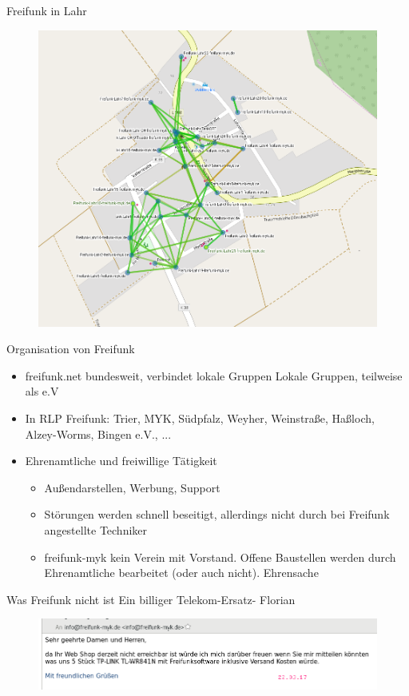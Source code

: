 \documentclass{beamer}
\begin{document}
\begin{frame}{Freifunk in Lahr}

\begin{figure}
	\centering
	\includegraphics[width=0.7\linewidth]{Bilder/Lahr}
	\caption{}
	\label{fig:lahr}
\end{figure}

\end{frame}

\begin{frame} {Organisation von Freifunk}
\begin{itemize}
\item freifunk.net bundesweit, verbindet lokale Gruppen
Lokale Gruppen, teilweise als e.V
\item In RLP Freifunk: Trier, MYK, Südpfalz, Weyher, Weinstraße, Haßloch, Alzey-Worms, Bingen e.V., ...
\item Ehrenamtliche und freiwillige Tätigkeit
\begin{itemize}
\item Außendarstellen, Werbung, Support
\item Störungen werden schnell beseitigt, allerdings nicht durch bei Freifunk angestellte Techniker
\item freifunk-myk kein Verein mit Vorstand. Offene Baustellen werden durch Ehrenamtliche bearbeitet (oder auch nicht). Ehrensache
\end{itemize}
\end{itemize}
\end{frame}

\begin{frame}{Was Freifunk nicht ist}
\glqq Ein billiger Telekom-Ersatz\grqq - Florian
\begin{figure}
\centering
\includegraphics[width=1.0\linewidth]{Bilder/Webshopmail}
\label{fig:webshopmail}
\end{figure}
\end{frame}
\end{document}
